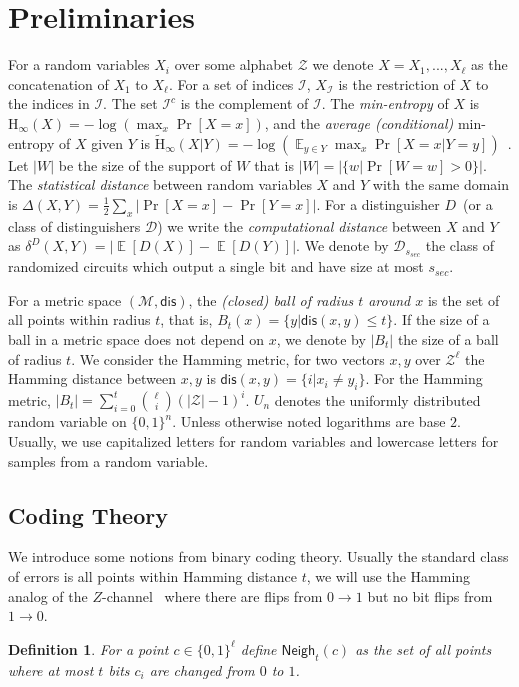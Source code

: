 \documentclass[11pt]{article}
\DeclareMathOperator*{\expe}{\mathbb{E}}
\newcommand{\class}[1]{{\ensuremath{\mathsf{#1}}}}
\newcommand{\zo}{\ensuremath{\{0, 1\}}}
\newcommand{\neigh}{\ensuremath{\class{Neigh}}\xspace}
\newcommand{\dis}{\ensuremath{\mathsf{dis}}}
\newcommand{\Hoo}{\mathrm{H}_\infty}
\newcommand{\Hav}{\tilde{\mathrm{H}}_\infty}
\newtheorem{definition}[theorem]{Definition}
\begin{document}
\section{Preliminaries}
\label{sec:preliminaries}
For a random variables $X_i$ over some alphabet $\mathcal{Z}$ we denote $X = X_1,..., X_\ell$ as the concatenation of $X_1$ to $X_\ell$.  For a set of indices $\mathcal{I}$,  $X_{\mathcal{I}}$ is the restriction of $X$ to the indices in $\mathcal{I}$.  The set $\mathcal{I}^c$ is the complement of $\mathcal{I}$.  The {\em min-entropy} of $X$ is $\Hoo(X) = -\log(\max_x \Pr[X=x])$,
and the {\em average (conditional)} min-entropy of $X$ given $Y$ is  $\Hav(X|Y) = -\log(\expe_{y\in Y} \max_{x} \Pr[X=x|Y=y])$~\cite[Section 2.4]{DBLP:journals/siamcomp/DodisORS08}.   Let $|W|$ be the size of the support of $W$ that is $|W| = |\{w | \Pr[W=w]>0\}|$.
The {\em statistical distance} between random variables $X$ and $Y$ with the same domain is $\Delta(X,Y) = \frac12 \sum_x |\Pr[X=x] - \Pr[Y=x]|$.
For a distinguisher $D$~(or a class of distinguishers $\mathcal{D}$) we write the \emph{computational distance} between $X$ and $Y$ as $\delta^D(X,Y) = \left| \expe[D(X)]-\expe[D(Y)]\right |$.  We denote by $\mathcal{D}_{s_{sec}}$ the class of randomized circuits which output a single bit and have size at most $s_{sec}$.

For a metric space $(\mathcal{M}, \dis)$, the \emph{(closed) ball of radius $t$ around $x$} is the set of all points within radius $t$, that is, $B_t(x) = \{y| \dis(x, y)\leq t\}$.  If the size of a ball in a metric space does not depend on $x$, we denote by $|B_t|$ the size of a ball of radius $t$.  We consider the Hamming metric, for two vectors $x, y$ over $\mathcal{Z}^\ell$ the Hamming distance between $x,y$ is $\dis(x,y) = \{i | x_i \neq y_i\}$.  For the Hamming metric, $|B_t| = \sum_{i=0}^t {\ell \choose i} (|\mathcal{Z}|-1)^i $.  $U_n$ denotes the uniformly  distributed random variable on $\{0,1\}^n$.  Unless otherwise noted logarithms are base $2$.
Usually, we use capitalized letters for random variables and lowercase letters for samples from a random variable.

\subsection{Coding Theory}
\label{sec:coding theory}
We introduce some notions from binary coding theory.  Usually the standard class of errors  is all points within Hamming distance $t$, we will use the Hamming analog of the $Z$-channel~\cite{tallini2002capacity} where there are flips from $0\rightarrow 1$ but no bit flips from $1\rightarrow 0$.
\begin{definition}
\label{def:hamming z channel}
For a point $c\in \zo^\ell$ define $\neigh_t(c) $ as the set of all points where at most $t$ bits $c_i$ are changed from $0$ to $1$.
\end{definition}
\end{document}
